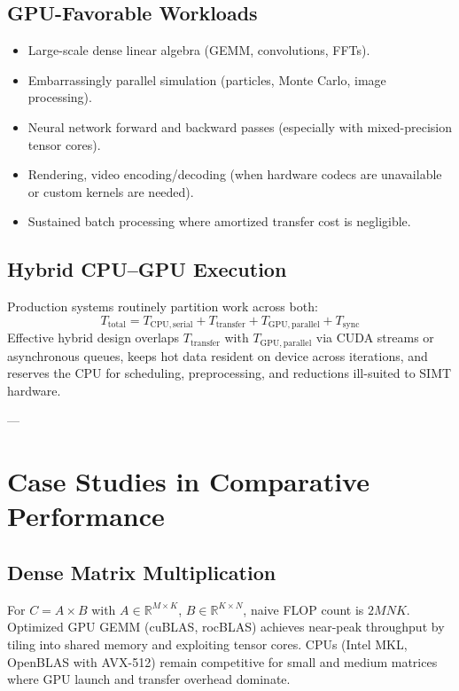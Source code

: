 \documentclass[11pt,journal,onecolumn]{IEEEtran}
\begin{document}
\subsection{GPU-Favorable Workloads}
\begin{itemize}
    \item Large-scale dense linear algebra (GEMM, convolutions, FFTs).
    \item Embarrassingly parallel simulation (particles, Monte Carlo, image processing).
    \item Neural network forward and backward passes (especially with mixed-precision tensor cores).
    \item Rendering, video encoding/decoding (when hardware codecs are unavailable or custom kernels are needed).
    \item Sustained batch processing where amortized transfer cost is negligible.
\end{itemize}

\subsection{Hybrid CPU--GPU Execution}
Production systems routinely partition work across both:
\begin{equation}
T_{\mathrm{total}} = T_{\mathrm{CPU,serial}} + T_{\mathrm{transfer}} + T_{\mathrm{GPU,parallel}} + T_{\mathrm{sync}}
\end{equation}
Effective hybrid design overlaps $T_{\mathrm{transfer}}$ with $T_{\mathrm{GPU,parallel}}$ via CUDA streams or asynchronous queues, keeps hot data resident on device across iterations, and reserves the CPU for scheduling, preprocessing, and reductions ill-suited to SIMT hardware.

---

\section{Case Studies in Comparative Performance}

\subsection{Dense Matrix Multiplication}
For $C = A \times B$ with $A \in \mathbb{R}^{M \times K}$, $B \in \mathbb{R}^{K \times N}$, naive FLOP count is $2MNK$. Optimized GPU GEMM (cuBLAS, rocBLAS) achieves near-peak throughput by tiling into shared memory and exploiting tensor cores. CPUs (Intel MKL, OpenBLAS with AVX-512) remain competitive for small and medium matrices where GPU launch and transfer overhead dominate.
\end{document}
